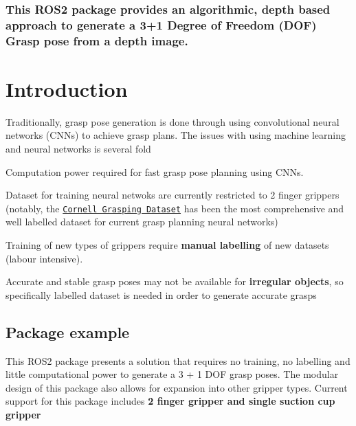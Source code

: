 \subsubsection*{This R\+O\+S2 package provides an {\bfseries algorithmic, depth based approach} to generate a {\bfseries 3+1 Degree of Freedom (D\+OF) Grasp pose} from a depth image.}

\href{https://travis-ci.com/gtan039/algorithmic-depth-based-grasp-planner}{\tt }

\section*{Introduction}

Traditionally, grasp pose generation is done through using convolutional neural networks (C\+N\+Ns) to achieve grasp plans. The issues with using machine learning and neural networks is several fold


\begin{DoxyEnumerate}
\item Computation power required for fast grasp pose planning using C\+N\+Ns.
\item Dataset for training neural netwoks are currently restricted to 2 finger grippers (notably, the \href{http://pr.cs.cornell.edu/grasping/rect_data/data.php}{\tt Cornell Grasping Dataset} has been the most comprehensive and well labelled dataset for current grasp planning neural networks)
\item Training of new types of grippers require {\bfseries manual labelling} of new datasets (labour intensive).
\item Accurate and stable grasp poses may not be available for {\bfseries irregular objects}, so specifically labelled dataset is needed in order to generate accurate grasps
\end{DoxyEnumerate}

\subsection*{Package example}

This R\+O\+S2 package presents a solution that requires no training, no labelling and little computational power to generate a 3 + 1 D\+OF grasp poses. The modular design of this package also allows for expansion into other gripper types. Current support for this package includes {\bfseries 2 finger gripper and single suction cup gripper}

~\newline


